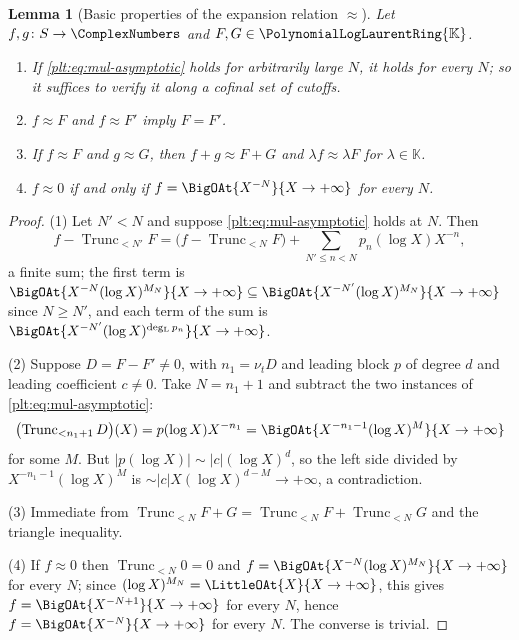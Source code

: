 \documentclass[11pt,oneside]{article}
\theoremstyle{plain}
\newtheorem{lemma}[theorem]{Lemma}
\theoremstyle{definition}
\theoremstyle{remark}
\newcommand{\K}{\mathbb{K}}
\newcommand{\PLlau}{\PolynomialLogLaurentRing{\K}}       %
\newcommand{\ordt}{\nu_{t}}                              %
\DeclareMathOperator{\degL}{deg_{L}}
\newcommand{\Trunc}[2]{\operatorname{Trunc}_{<#2}#1}     %
\begin{document}
\begin{lemma}[Basic properties of the expansion relation $\approx$]
\label{plt:lem:mul-asymptotic-basic}
Let $f,g\colon S\to\ComplexNumbers$ and $F,G\in\PLlau$.
\begin{enumerate}
\item If \eqref{plt:eq:mul-asymptotic} holds for arbitrarily large $N$, it
holds for every $N$; so it suffices to verify it along a cofinal set of
cutoffs.
\item $f\approx F$ and $f\approx F'$ imply $F=F'$.
\item If $f\approx F$ and $g\approx G$, then $f+g\approx F+G$ and
$\lambda f\approx\lambda F$ for $\lambda\in\K$.
\item $f\approx0$ if and only if $f=\BigOAt{X^{-N}}{X\to+\infty}$ for every
$N$.
\end{enumerate}
\end{lemma}

\begin{proof}
(1) Let $N'<N$ and suppose \eqref{plt:eq:mul-asymptotic} holds at $N$.  Then
\[
 f-\Trunc{F}{N'}=\bigl(f-\Trunc{F}{N}\bigr)
   +\sum_{N'\le n<N}p_n(\log X)X^{-n},
\]
a finite sum; the first term is $\BigOAt{X^{-N}(\log
X)^{M_N}}{X\to+\infty}\subseteq\BigOAt{X^{-N'}(\log X)^{M_N}}{X\to+\infty}$
since $N\ge N'$, and each term of the sum is
$\BigOAt{X^{-N'}(\log X)^{\degL p_n}}{X\to+\infty}$.

(2) Suppose $D=F-F'\ne0$, with $n_1=\ordt D$ and leading block $p$ of degree
$d$ and leading coefficient $c\ne0$.  Take $N=n_1+1$ and subtract the two
instances of \eqref{plt:eq:mul-asymptotic}:
\[
 \bigl(\Trunc{D}{n_1+1}\bigr)(X)=p(\log X)X^{-n_1}
 =\BigOAt{X^{-n_1-1}(\log X)^{M}}{X\to+\infty}
\]
for some $M$.  But $|p(\log X)|\sim|c|(\log X)^{d}$, so the left side
divided by $X^{-n_1-1}(\log X)^M$ is $\sim|c|X(\log X)^{d-M}\to+\infty$, a
contradiction.

(3) Immediate from
$\Trunc{F+G}{N}=\Trunc{F}{N}+\Trunc{G}{N}$ and the triangle inequality.

(4) If $f\approx0$ then $\Trunc{0}{N}=0$ and $f=\BigOAt{X^{-N}(\log
X)^{M_N}}{X\to+\infty}$ for every $N$; since $(\log
X)^{M_N}=\LittleOAt{X}{X\to+\infty}$, this gives
$f=\BigOAt{X^{-N+1}}{X\to+\infty}$ for every $N$, hence
$f=\BigOAt{X^{-N}}{X\to+\infty}$ for every $N$.  The converse is trivial.
\end{proof}
\end{document}
